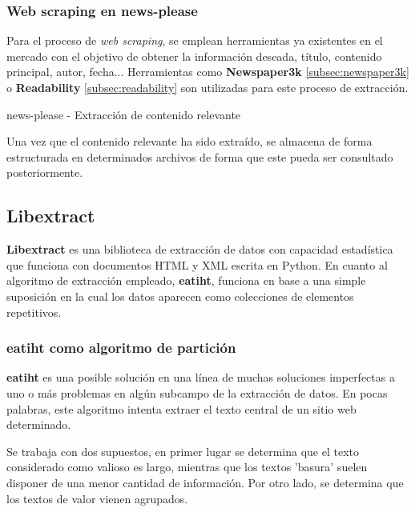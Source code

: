 \subsubsection{Web scraping en news-please}
\label{subsubsec:web scraping en news-please}

Para el proceso de \emph{web scraping}, se emplean herramientas ya existentes en el mercado con el objetivo 
de obtener la información deseada, título, contenido principal, autor, fecha... Herramientas como 
\textbf{Newspaper3k} \ref{subsec:newspaper3k} o \textbf{Readability} \ref{subsec:readability} son utilizadas 
para este proceso de extracción.

\begin{codefloat}
  
  \caption{news-please - Extracción de contenido relevante}
  \label{cod:news-please - extraccion de contenido relevante}
\end{codefloat}

Una vez que el contenido relevante ha sido extraído, se almacena de forma estructurada en determinados
archivos de forma que este pueda ser consultado posteriormente.

\subsection{Libextract}
\label{subsec:libextract}

\textbf{Libextract} \cite{libextract} es una biblioteca de extracción de datos con capacidad estadística
que funciona con documentos HTML y XML escrita en Python. En cuanto al algoritmo de extracción empleado,
\textbf{eatiht}, funciona en base a una simple suposición en la cual los datos aparecen como colecciones 
de elementos repetitivos.

\subsubsection{eatiht como algoritmo de partición}
\label{subsubsec:eatiht como algoritmo de particion}

\textbf{eatiht} \cite{eatiht} es una posible solución en una línea de muchas soluciones imperfectas a uno 
o más problemas en algún subcampo de la extracción de datos. En pocas palabras, este algoritmo intenta 
extraer el texto central de un sitio web determinado.

Se trabaja con dos supuestos, en primer lugar se determina que el texto considerado como valioso es largo, 
mientras que los textos 'basura' suelen disponer de una menor cantidad de información. Por otro lado, se 
determina que los textos de valor vienen agrupados.

